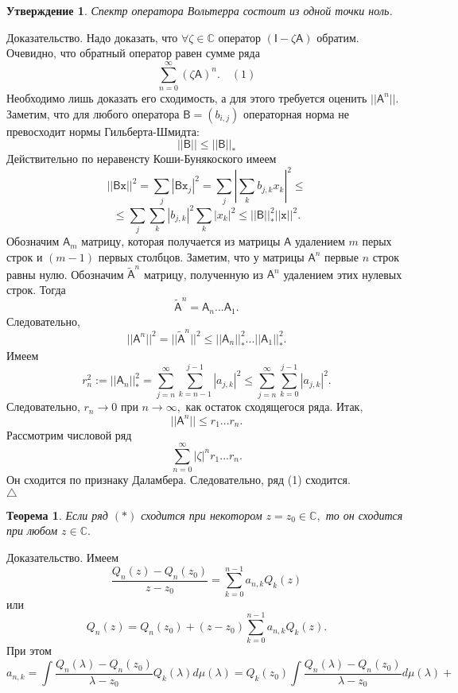 \documentclass[12 pt, a4 paper]{article}
\theoremstyle{plain}   \newtheorem{Pro}{Задача}
\newtheorem{Sta}{Утверждение}
\newtheorem{The}{Теорема}
\begin{document}
\begin{Sta}
Спектр оператора Вольтерра состоит из одной точки ноль.
\end{Sta}
{\Large Доказательство.}
Надо доказать, что
$ \forall \zeta \in \mathbb{C} $
оператор
$ (\mathsf{I}-\zeta \mathsf{A}) $
обратим. Очевидно, что обратный оператор равен сумме ряда
$$
  \sum _{n=0}^{\infty} (\zeta \mathsf{A})^n .
  \quad ( 1)
$$
Необходимо лишь доказать его сходимость, а для этого требуется
оценить
$ ||\mathsf{A}^n ||. $
Заметим, что для любого оператора
$ \mathsf{B}=(b_{i,j}) $
операторная норма не превосходит нормы Гильберта-Шмидта:
$$
  ||\mathsf{B}|| \leq ||\mathsf{B}||_{\ast}
$$
Действительно по неравенсту Коши-Бунякоского имеем
$$
  ||\mathsf{B}\mathtt{x}||^2 =\sum _j |\mathsf{B}\mathtt{x}_j |^2 =
  \sum _j |\sum _k b_{j,k}x_k |^2 \leq
$$
$$
  \leq \sum _j \sum _k |b_{j,k}|^2 \sum _k |x_k |^2 \leq
  ||\mathsf{B}||_{\ast}^2 ||\mathtt{x}||^2 .
$$
Обозначим
$ \mathsf{A}_m $
матрицу, которая получается из матрицы
$ \mathsf{A} $
удалением
$ m $
перых строк и
$ (m-1) $
первых столбцов. Заметим, что у матрицы
$ \mathsf{A}^n $
первые
$ n $
строк равны нулю. Обозначим
$ \tilde{\mathsf{A}}^n $
матрицу, полученную из
$ \mathsf{A}^n $
удалением этих нулевых строк. Тогда
$$
  \tilde{\mathsf{A}}^n = \mathsf{A}_n ...\mathsf{A}_1 .
$$
Следовательно,
$$
  ||\mathsf{A}^n ||^2 =|| \tilde{\mathsf{A}}^n ||^2 \leq
  ||\mathsf{A}_n ||_{\ast}^2 ...||\mathsf{A}_1 ||_{\ast}^2 .
$$
Имеем
$$
  r_n ^2 := ||\mathsf{A}_n ||_{\ast}^2 =
  \sum _{j=n}^{\infty} \sum _{k=n-1}^{j-1}
  |a_{j,k}|^2 \leq
  \sum _{j=n}^{\infty} \sum _{k=0}^{j-1} |a_{j,k}|^2 .
$$
Следовательно,
$ r_n \rightarrow 0 $
при
$ n \rightarrow \infty , $
как остаток сходящегося ряда. Итак,
$$
  ||\mathsf{A}^n || \leq r_1 ...r_n .
$$
Рассмотрим числовой ряд
$$
  \sum _{n=0}^{\infty} |\zeta |^n r_1 ...r_n .
$$
Он сходится по признаку Даламбера. Следовательно, ряд (1)
сходится.
\\
$ \triangle $
\begin{The}
Если ряд
$ (\ast ) $
сходится при некотором
$ z=z_0 \in \mathbb{C} , $
то он сходится при любом
$ z \in \mathbb{C} . $
\end{The}
{\Large Доказательство.}
Имеем
$$
  \frac{Q_n (z)-Q_n (z_0 )}{z-z_0 }=
  \sum _{k=0}^{n-1}a_{n,k}Q_k (z)
$$
или
$$
  Q_n (z)=Q_n (z_0 ) +(z-z_0 ) \sum _{k=0}^{n-1}
  a_{n,k}Q_k (z).
$$
При этом
$$
  a_{n,k}= \int \frac{Q_n (\lambda )-Q_n (z_0 )}
  {\lambda -z_0 } Q_k (\lambda ) d \mu (\lambda ) =
  Q_k (z_0 ) \int \frac{Q_n (\lambda )-Q_n (z_0 )}
  {\lambda -z_0 } d\mu (\lambda) +
$$
\end{document}

